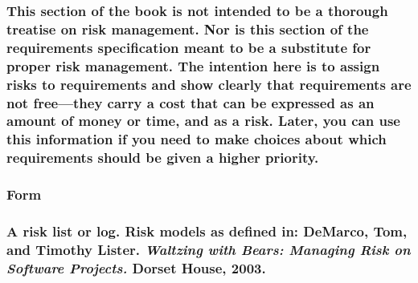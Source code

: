\documentclass[
]{article}
\begin{document}
\hypertarget{this-section-of-the-book-is-not-intended-to-be-a-thorough-treatise-on-risk-management.-nor-is-this-section-of-the-requirements-specification-meant-to-be-a-substitute-for-proper-risk-management.-the-intention-here-is-to-assign-risks-to-requirements-and-show-clearly-that-requirements-are-not-freethey-carry-a-cost-that-can-be-expressed-as-an-amount-of-money-or-time-and-as-a-risk.-later-you-can-use-this-information-if-you-need-to-make-choices-about-which-requirements-should-be-given-a-higher-priority.}{%
\subsubsection{This section of the book is not intended to be a thorough
treatise on risk management. Nor is this section of the requirements
specification meant to be a substitute for proper risk management. The
intention here is to assign risks to requirements and show clearly that
requirements are not free---they carry a cost that can be expressed as
an amount of money or time, and as a risk. Later, you can use this
information if you need to make choices about which requirements should
be given a higher
priority.}\label{this-section-of-the-book-is-not-intended-to-be-a-thorough-treatise-on-risk-management.-nor-is-this-section-of-the-requirements-specification-meant-to-be-a-substitute-for-proper-risk-management.-the-intention-here-is-to-assign-risks-to-requirements-and-show-clearly-that-requirements-are-not-freethey-carry-a-cost-that-can-be-expressed-as-an-amount-of-money-or-time-and-as-a-risk.-later-you-can-use-this-information-if-you-need-to-make-choices-about-which-requirements-should-be-given-a-higher-priority.}}

\hypertarget{form-37}{%
\subsubsection{Form}\label{form-37}}

\hypertarget{a-risk-list-or-log.-risk-models-as-defined-in-demarco-tom-and-timothy-lister.-waltzing-with-bears-managing-risk-on-software-projects.-dorset-house-2003.}{%
\subsubsection{\texorpdfstring{A risk list or log. Risk models as
defined in: DeMarco, Tom, and Timothy Lister. \emph{Waltzing with Bears:
Managing Risk on Software Projects.} Dorset House,
2003.}{A risk list or log. Risk models as defined in: DeMarco, Tom, and Timothy Lister. Waltzing with Bears: Managing Risk on Software Projects. Dorset House, 2003.}}\label{a-risk-list-or-log.-risk-models-as-defined-in-demarco-tom-and-timothy-lister.-waltzing-with-bears-managing-risk-on-software-projects.-dorset-house-2003.}}
\end{document}
